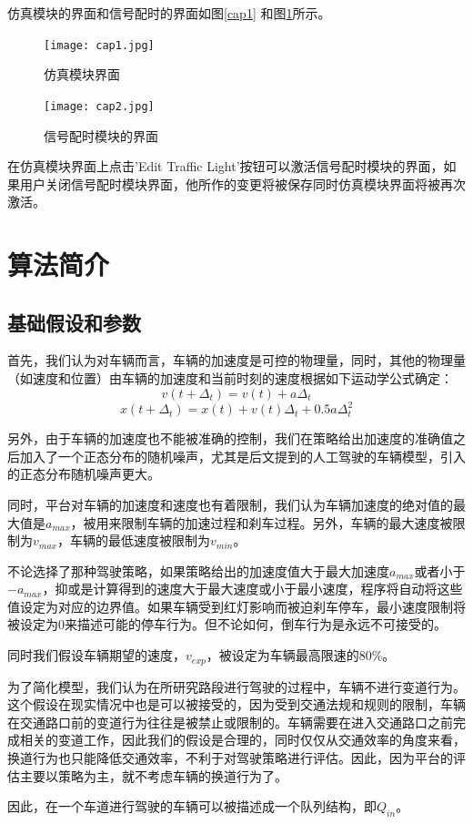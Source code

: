 \documentclass[a4paper,UTF8]{paper}
\begin{document}
仿真模块的界面和信号配时的界面如图\ref{cap1} 和图\ref{cap2}所示。

\begin{figure}
\centering
\texttt{[image: cap1.jpg]}
\caption{仿真模块界面}
\label{cap1}
\texttt{[image: cap2.jpg]}
\caption{信号配时模块的界面}
\label{cap2}
\end{figure} 

在仿真模块界面上点击'Edit Traffic Light'按钮可以激活信号配时模块的界面，如果用户关闭信号配时模块界面，他所作的变更将被保存同时仿真模块界面将被再次激活。

\clearpage
\section{算法简介}
\subsection{基础假设和参数}
首先，我们认为对车辆而言，车辆的加速度是可控的物理量，同时，其他的物理量（如速度和位置）由车辆的加速度和当前时刻的速度根据如下运动学公式确定： 
$$v(t+\Delta_t)=v(t)+a\Delta_t$$
$$x(t+\Delta_t)=x(t)+v(t)\Delta_t+0.5a\Delta_t^2$$ 

另外，由于车辆的加速度也不能被准确的控制，我们在策略给出加速度的准确值之后加入了一个正态分布的随机噪声，尤其是后文提到的人工驾驶的车辆模型，引入的正态分布随机噪声更大。

同时，平台对车辆的加速度和速度也有着限制，我们认为车辆加速度的绝对值的最大值是$a_{max}$，被用来限制车辆的加速过程和刹车过程。另外，车辆的最大速度被限制为$v_{max}$，车辆的最低速度被限制为$v_{min}$。

不论选择了那种驾驶策略，如果策略给出的加速度值大于最大加速度$a_{max}$或者小于$-a_{max}$，抑或是计算得到的速度大于最大速度或小于最小速度，程序将自动将这些值设定为对应的边界值。如果车辆受到红灯影响而被迫刹车停车，最小速度限制将被设定为0来描述可能的停车行为。但不论如何，倒车行为是永远不可接受的。

同时我们假设车辆期望的速度，$v_{exp}$，被设定为车辆最高限速的80\%。

为了简化模型，我们认为在所研究路段进行驾驶的过程中，车辆不进行变道行为。这个假设在现实情况中也是可以被接受的，因为受到交通法规和规则的限制，车辆在交通路口前的变道行为往往是被禁止或限制的。车辆需要在进入交通路口之前完成相关的变道工作，因此我们的假设是合理的，同时仅仅从交通效率的角度来看，换道行为也只能降低交通效率，不利于对驾驶策略进行评估。因此，因为平台的评估主要以策略为主，就不考虑车辆的换道行为了。

因此，在一个车道进行驾驶的车辆可以被描述成一个队列结构，即$Q_{in}$。
\end{document}
